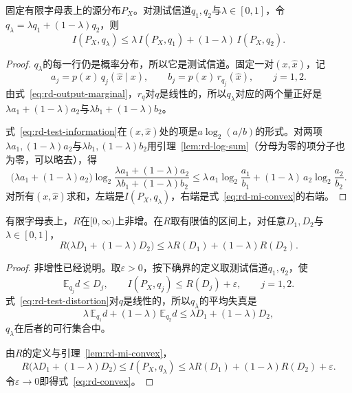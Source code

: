 \begin{lemma}[互信息对测试信道的凸性]
\label{lem:rd-mi-convex}
固定有限字母表上的源分布$P_X$。对测试信道$q_1,q_2$与$\lambda\in[0,1]$，令$q_\lambda=\lambda q_1+(1-\lambda)q_2$，则
\begin{equation}
  I(P_X,q_\lambda)\leq\lambda\,I(P_X,q_1)+(1-\lambda)\,I(P_X,q_2).
  \label{eq:rd-mi-convex}
\end{equation}
\end{lemma}

\begin{proof}
$q_\lambda$的每一行仍是概率分布，所以它是测试信道。固定一对$(x,\hat{x})$，记
\[
  a_j=p(x)\,q_j(\hat{x}\mid x),\qquad b_j=p(x)\,r_{q_j}(\hat{x}),\qquad j=1,2 .
\]
由式~\eqref{eq:rd-output-marginal}，$r_q$对$q$是线性的，所以$q_\lambda$对应的两个量正好是$\lambda a_1+(1-\lambda)a_2$与$\lambda b_1+(1-\lambda)b_2$。

式~\eqref{eq:rd-test-information}在$(x,\hat{x})$处的项是$a\log_2(a/b)$的形式。对两项$\lambda a_1,(1-\lambda)a_2$与$\lambda b_1,(1-\lambda)b_2$用引理~\ref{lem:rd-log-sum}（分母为零的项分子也为零，可以略去），得
\[
  \bigl(\lambda a_1+(1-\lambda)a_2\bigr)\log_2\frac{\lambda a_1+(1-\lambda)a_2}{\lambda b_1+(1-\lambda)b_2}
  \leq\lambda\,a_1\log_2\frac{a_1}{b_1}+(1-\lambda)\,a_2\log_2\frac{a_2}{b_2}.
\]
对所有$(x,\hat{x})$求和，左端是$I(P_X,q_\lambda)$，右端是式~\eqref{eq:rd-mi-convex}的右端。
\end{proof}

\begin{theorem}[$R(D)$的单调性与凸性]
\label{thm:rd-convex}
有限字母表上，$R$在$[0,\infty)$上非增。在$R$取有限值的区间上，对任意$D_1,D_2$与$\lambda\in[0,1]$，
\begin{equation}
  R\bigl(\lambda D_1+(1-\lambda)D_2\bigr)\leq\lambda R(D_1)+(1-\lambda)R(D_2).
  \label{eq:rd-convex}
\end{equation}
\end{theorem}

\begin{proof}
非增性已经说明。取$\varepsilon>0$，按下确界的定义取测试信道$q_1,q_2$，使
\[
  \mathbb{E}_{q_j}d\leq D_j,\qquad I(P_X,q_j)\leq R(D_j)+\varepsilon,\qquad j=1,2 .
\]
式~\eqref{eq:rd-test-distortion}对$q$是线性的，所以$q_\lambda$的平均失真是
\[
  \lambda\,\mathbb{E}_{q_1}d+(1-\lambda)\,\mathbb{E}_{q_2}d\leq\lambda D_1+(1-\lambda)D_2 ,
\]
$q_\lambda$在后者的可行集合中。

由$R$的定义与引理~\ref{lem:rd-mi-convex}，
\[
  R\bigl(\lambda D_1+(1-\lambda)D_2\bigr)\leq I(P_X,q_\lambda)
  \leq\lambda R(D_1)+(1-\lambda)R(D_2)+\varepsilon .
\]
令$\varepsilon\to0$即得式~\eqref{eq:rd-convex}。
\end{proof}

